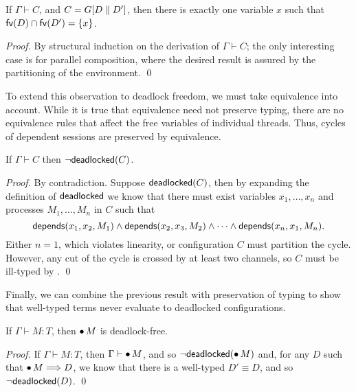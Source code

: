 \documentclass[oribibl,orivec,envcountsame]{llncs}
\begin{document}
\begin{lemma}\label{lem:procs-share-one-channel}
  If $\Gamma \vdash C$, and $C = G[D \parallel D']$, then there is exactly one variable $x$ such
  that $\mathsf{fv}(D) \cap \mathsf{fv}(D') = \{ x \}$.
\end{lemma}

\begin{proof}
  By structural induction on the derivation of $\Gamma \vdash C$; the only interesting case is for
  parallel composition, where the desired result is assured by the partitioning of the
  environment. \qed
\end{proof}

To extend this observation to deadlock freedom, we must take equivalence into account.  While it is
true that equivalence need not preserve typing, there are no equivalence rules that affect the free
variables of individual threads.  Thus, cycles of dependent sessions are preserved by equivalence.

\begin{lemma}\label{lem:typed-configs-df}
  If $\Gamma \vdash C$ then $\lnot \mathsf{deadlocked}(C)$.
\end{lemma}

\begin{proof}
  By contradiction. Suppose $\mathsf{deadlocked}(C)$, then by expanding the definition of $\mathsf{deadlocked}$ we
  know that there must exist variables $x_1,\dots,x_n$ and processes $M_1,\dots,M_n$ in $C$ such
  that
  \[
    \mathsf{depends}(x_1,x_2,M_1) \land \mathsf{depends}(x_2,x_3,M_2) \land \cdots \land \mathsf{depends}(x_n,x_1,M_n).
  \]
  Either $n = 1$, which violates linearity, or configuration $C$ must partition the cycle. However,
  any cut of the cycle is crossed by at least two channels, so $C$ must be ill-typed by
  . \qed
\end{proof}

Finally, we can combine the previous result with preservation of typing to show that well-typed
terms never evaluate to deadlocked configurations.

\begin{theorem}\label{thm:typed-terms-df}
  If $\Gamma \vdash M: T$, then ${\mathord{\bullet}}\,M$ is deadlock-free.
\end{theorem}

\begin{proof}
  If $\Gamma \vdash M: T$, then $\Gamma \vdash {\mathord{\bullet}}\,M$, and so
  $\lnot\mathsf{deadlocked}({\mathord{\bullet}}\,M)$ and, for any $D$ such that ${\mathord{\bullet}}\,M \Longrightarrow D$, we
  know that there is a well-typed $D' \equiv D$, and so $\lnot\mathsf{deadlocked}(D)$. \qed
\end{proof}
\end{document}
